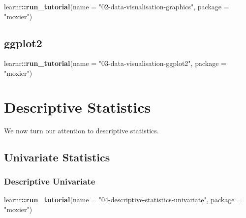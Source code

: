 \documentclass[]{book}
\newenvironment{Shaded}{\begin{snugshade}}{\end{snugshade}}
\newcommand{\KeywordTok}[1]{\textcolor[rgb]{0.13,0.29,0.53}{\textbf{#1}}}
\newcommand{\DataTypeTok}[1]{\textcolor[rgb]{0.13,0.29,0.53}{#1}}
\newcommand{\StringTok}[1]{\textcolor[rgb]{0.31,0.60,0.02}{#1}}
\newcommand{\OperatorTok}[1]{\textcolor[rgb]{0.81,0.36,0.00}{\textbf{#1}}}
\newcommand{\NormalTok}[1]{#1}
\begin{document}
\begin{Shaded}
\begin{Highlighting}[]
\NormalTok{learnr}\OperatorTok{::}\KeywordTok{run_tutorial}\NormalTok{(}\DataTypeTok{name =} \StringTok{"02-data-visualisation-graphics"}\NormalTok{,}
                     \DataTypeTok{package =} \StringTok{"moxier"}\NormalTok{)}
\end{Highlighting}
\end{Shaded}

\section{\texorpdfstring{\textbf{ggplot2}}{ggplot2}}\label{ggplot2}

\begin{Shaded}
\begin{Highlighting}[]
\NormalTok{learnr}\OperatorTok{::}\KeywordTok{run_tutorial}\NormalTok{(}\DataTypeTok{name =} \StringTok{"03-data-visualisation-ggplot2"}\NormalTok{,}
                     \DataTypeTok{package =} \StringTok{"moxier"}\NormalTok{)}
\end{Highlighting}
\end{Shaded}

\chapter{Descriptive Statistics}\label{descriptive-statistics}

We now turn our attention to descriptive statistics.

\section{Univariate Statistics}\label{univariate-statistics}

\subsection{Descriptive Univariate}\label{descriptive-univariate}

\begin{Shaded}
\begin{Highlighting}[]
\NormalTok{learnr}\OperatorTok{::}\KeywordTok{run_tutorial}\NormalTok{(}\DataTypeTok{name =} \StringTok{"04-descriptive-statistics-univariate"}\NormalTok{,}
                     \DataTypeTok{package =} \StringTok{"moxier"}\NormalTok{)}
\end{Highlighting}
\end{Shaded}
\end{document}
